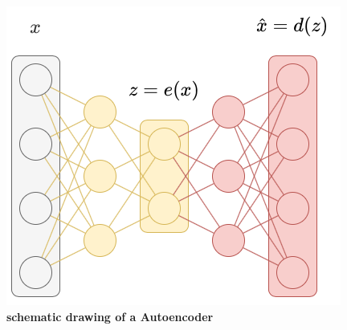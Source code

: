 \begin{figure}
    \centering
    \includegraphics[width=0.5\linewidth]{figures/background/AE.png}
    \caption[Autoencoder schematics]{\textbf{schematic drawing of a Autoencoder}}
    \label{fig:Autoencoder_schematics}
\end{figure}